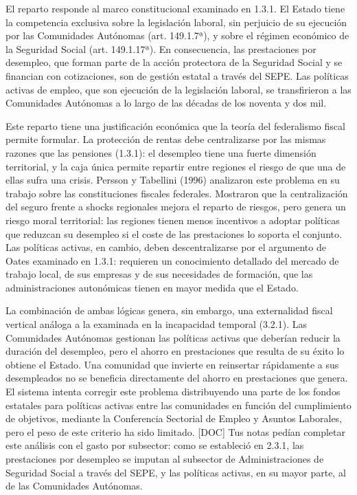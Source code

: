 \documentclass[10pt,a4paper]{article}
\begin{document}
El reparto responde al marco constitucional examinado en 1.3.1. El Estado tiene la competencia exclusiva sobre la legislación laboral, sin perjuicio de su ejecución por las Comunidades Autónomas (art. 149.1.7ª), y sobre el régimen económico de la Seguridad Social (art. 149.1.17ª). En consecuencia, las prestaciones por desempleo, que forman parte de la acción protectora de la Seguridad Social y se financian con cotizaciones, son de gestión estatal a través del SEPE. Las políticas activas de empleo, que son ejecución de la legislación laboral, se transfirieron a las Comunidades Autónomas a lo largo de las décadas de los noventa y dos mil.

Este reparto tiene una justificación económica que la teoría del federalismo fiscal permite formular. La protección de rentas debe centralizarse por las mismas razones que las pensiones (1.3.1): el desempleo tiene una fuerte dimensión territorial, y la caja única permite repartir entre regiones el riesgo de que una de ellas sufra una crisis. Persson y Tabellini (1996) analizaron este problema en su trabajo sobre las constituciones fiscales federales. Mostraron que la centralización del seguro frente a shocks regionales mejora el reparto de riesgos, pero genera un riesgo moral territorial: las regiones tienen menos incentivos a adoptar políticas que reduzcan su desempleo si el coste de las prestaciones lo soporta el conjunto. Las políticas activas, en cambio, deben descentralizarse por el argumento de Oates examinado en 1.3.1: requieren un conocimiento detallado del mercado de trabajo local, de sus empresas y de sus necesidades de formación, que las administraciones autonómicas tienen en mayor medida que el Estado.

La combinación de ambas lógicas genera, sin embargo, una externalidad fiscal vertical análoga a la examinada en la incapacidad temporal (3.2.1). Las Comunidades Autónomas gestionan las políticas activas que deberían reducir la duración del desempleo, pero el ahorro en prestaciones que resulta de su éxito lo obtiene el Estado. Una comunidad que invierte en reinsertar rápidamente a sus desempleados no se beneficia directamente del ahorro en prestaciones que genera. El sistema intenta corregir este problema distribuyendo una parte de los fondos estatales para políticas activas entre las comunidades en función del cumplimiento de objetivos, mediante la Conferencia Sectorial de Empleo y Asuntos Laborales, pero el peso de este criterio ha sido limitado. [DOC] Tus notas pedían completar este análisis con el gasto por subsector: como se estableció en 2.3.1, las prestaciones por desempleo se imputan al subsector de Administraciones de Seguridad Social a través del SEPE, y las políticas activas, en su mayor parte, al de las Comunidades Autónomas.
\end{document}

